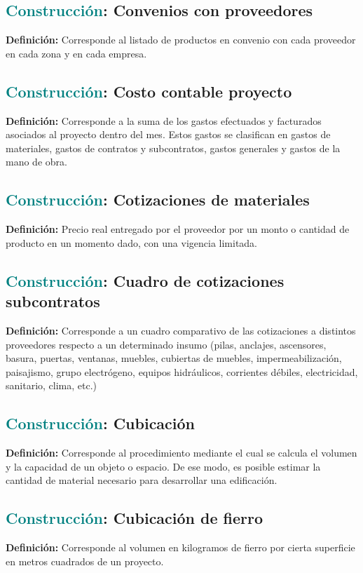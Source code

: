 \documentclass[12pt]{article}
\begin{document}
\subsection{\textcolor{teal}{Construcción}: Convenios con proveedores}
\textbf{Definición:} Corresponde al listado de productos en convenio con cada proveedor en cada zona y en cada empresa.
\subsection{\textcolor{teal}{Construcción}: Costo contable proyecto}
\textbf{Definición:} Corresponde a la suma de los gastos efectuados y facturados asociados al proyecto dentro del mes. Estos gastos se clasifican en gastos de materiales, gastos de contratos y subcontratos, gastos generales y gastos de la mano de obra.
\subsection{\textcolor{teal}{Construcción}: Cotizaciones de materiales}
\textbf{Definición:} Precio real entregado por el proveedor por un monto o cantidad de producto en un momento dado, con una vigencia limitada.
\subsection{\textcolor{teal}{Construcción}: Cuadro de cotizaciones subcontratos}
\textbf{Definición:} Corresponde a un cuadro comparativo de las cotizaciones a distintos proveedores respecto a un determinado insumo (pilas, anclajes, ascensores, basura, puertas, ventanas, muebles, cubiertas de muebles, impermeabilización, paisajismo, grupo electrógeno, equipos hidráulicos, corrientes débiles, electricidad, sanitario, clima, etc.)
\subsection{\textcolor{teal}{Construcción}: Cubicación}
\textbf{Definición:} Corresponde al procedimiento mediante el cual se calcula el volumen y la capacidad de un objeto o espacio. De ese modo, es posible estimar la cantidad de material necesario para desarrollar una edificación.
\subsection{\textcolor{teal}{Construcción}: Cubicación de fierro}
\textbf{Definición:} Corresponde al volumen en kilogramos de fierro por cierta superficie en metros cuadrados de un proyecto.
\end{document}
